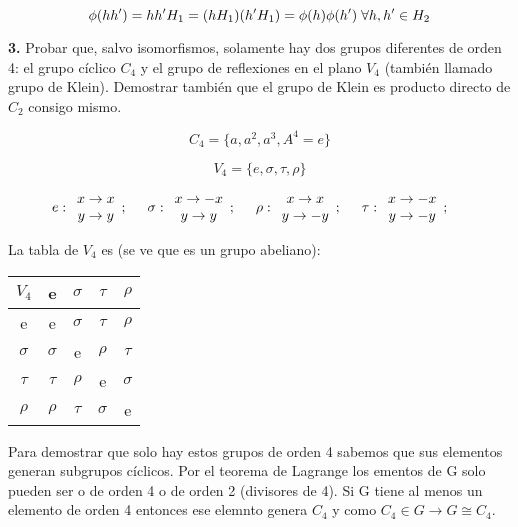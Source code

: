 \documentclass{article}
\begin{document}
 $$\phi (hh')=hh'H_1=(hH_1)(h'H_1)=\phi (h) \phi (h') \hspace{0.1cm}\forall h,h' \in H_2$$

\bigskip
\textbf{3.} Probar que, salvo isomorfismos, solamente hay dos grupos diferentes de orden 4: el grupo cíclico $C_4$ y el grupo de
reflexiones en el plano $V_4$ (también llamado grupo de Klein). Demostrar también que el grupo de Klein es producto
directo de $C_2$ consigo mismo.

\smallskip
$$C_4=\lbrace  a,a^2,a^3,A^4=e\rbrace$$

$$V_4=\lbrace e,\sigma ,\tau ,\rho \rbrace$$

$$e: \begin{array}{c}
     x\to x  \\
     y\to y
\end{array}; \hspace{0.5cm} \sigma : \begin{array}{c}
     x\to -x  \\
     y\to y
\end{array}; \hspace{0.5cm} \rho : \begin{array}{c}
     x\to x  \\
     y\to -y
\end{array}; \hspace{0.5cm} \tau : \begin{array}{c}
     x\to -x  \\
     y\to -y
\end{array}; \hspace{0.5cm}$$

\smallskip
La tabla de $V_4$ es (se ve que es un grupo abeliano):

\begin{center}
\begin{tabular}[b]{ c | c c c c }
$V_4$ & e & $\sigma $ & $\tau $ & $\rho $\\
 \hline
e & e & $\sigma $ & $\tau $ & $\rho $ \\
$\sigma $ & $\sigma $ & e & $\rho $ & $\tau $ \\
$\tau $ & $\tau $ & $\rho $ & e & $\sigma $ \\
$\rho $ & $\rho $ & $\tau $ & $\sigma $ & e
\end{tabular}
\end{center}


\smallskip
Para demostrar que solo hay estos grupos de orden 4 sabemos que sus elementos generan subgrupos cíclicos. Por el teorema de Lagrange los ementos de G solo pueden ser o de orden 4 o de orden 2 (divisores de 4). Si G tiene al menos un elemento de orden 4 entonces ese elemnto genera $C_4$ y como $C_4 \in G \to G \cong C_4$.
\end{document}
